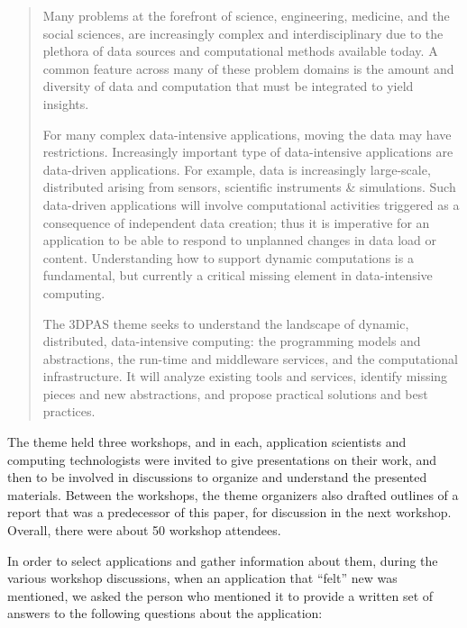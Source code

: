 \documentclass[times]{cpeauth}
\begin{document}
\begin{quote} Many problems at the forefront of science, engineering, medicine,
and the social sciences, are increasingly complex and interdisciplinary due to
the plethora of data sources and computational methods available today. A common
feature across many of these problem domains is the amount and diversity of data
and computation that must be integrated to yield insights.

For many complex data-intensive applications, moving the data may have
restrictions. Increasingly important type of data-intensive applications are
data-driven applications. For example, data is increasingly large-scale,
distributed arising from sensors, scientific instruments \& simulations. Such
data-driven applications will involve computational activities triggered as a
consequence of independent data creation; thus it is imperative for an
application to be able to respond to unplanned changes in data load or
content. Understanding how to support dynamic computations is a fundamental, but
currently a critical missing element in data-intensive computing.

The 3DPAS theme seeks to understand the landscape of dynamic, distributed,
data-intensive computing: the programming models and abstractions, the run-time
and middleware services, and the computational infrastructure. It will analyze
existing tools and services, identify missing pieces and new abstractions, and
propose practical solutions and best practices.
\end{quote}

The theme held three workshops, and in each, application scientists and
computing technologists were invited to give presentations on their work, and
then to be involved in discussions to organize and understand the presented
materials.  Between the workshops, the theme organizers also drafted outlines of
a report that was a predecessor of this paper, for discussion in the next
workshop.  Overall, there were about 50 workshop attendees.

In order to select applications and gather information about them, during the
various workshop discussions, when an application that ``felt'' new was
mentioned, we asked the person who mentioned it to provide a written set of
answers to the following questions about the application:
\end{document}

